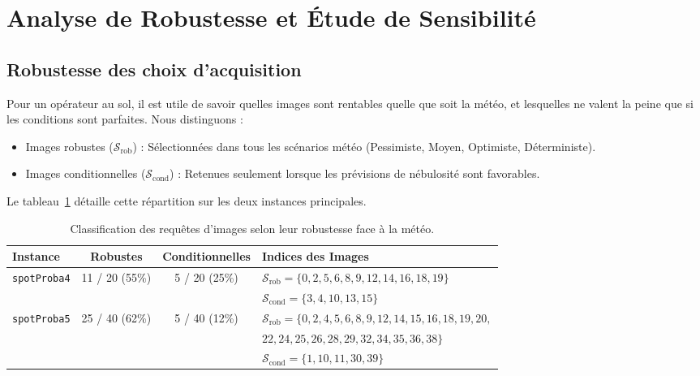 \section{Analyse de Robustesse et Étude de Sensibilité}
\label{sec:robustesse}

\subsection{Robustesse des choix d'acquisition}
Pour un opérateur au sol, il est utile de savoir quelles images sont rentables quelle que soit la météo, et lesquelles ne valent la peine que si les conditions sont parfaites. Nous distinguons :
\begin{itemize}
    \item Images robustes ($\mathcal{S}_{\text{rob}}$) : Sélectionnées dans tous les scénarios météo (Pessimiste, Moyen, Optimiste, Déterministe).
    \item Images conditionnelles ($\mathcal{S}_{\text{cond}}$) : Retenues seulement lorsque les prévisions de nébulosité sont favorables.
\end{itemize}

Le tableau~\ref{tab:robustesse} détaille cette répartition sur les deux instances principales.

\begin{table}[H]
\centering
\small
\begin{tabularx}{\textwidth}{lccl}
\toprule
\textbf{Instance} & \textbf{Robustes} & \textbf{Conditionnelles} & \textbf{Indices des Images} \\
\midrule
\multirow{2}{*}{\texttt{spotProba4}} & \multirow{2}{*}{11 / 20 (55\%)} & \multirow{2}{*}{5 / 20 (25\%)} & $\mathcal{S}_{\text{rob}} = \{0, 2, 5, 6, 8, 9, 12, 14, 16, 18, 19\}$ \\
 & & & $\mathcal{S}_{\text{cond}} = \{3, 4, 10, 13, 15\}$ \\
\midrule
\multirow{2}{*}{\texttt{spotProba5}} & \multirow{2}{*}{25 / 40 (62\%)} & \multirow{2}{*}{5 / 40 (12\%)} & $\mathcal{S}_{\text{rob}} = \{0, 2, 4, 5, 6, 8, 9, 12, 14, 15, 16, 18, 19, 20,$ \\
 & & & \quad\qquad $22, 24, 25, 26, 28, 29, 32, 34, 35, 36, 38\}$ \\
 & & & $\mathcal{S}_{\text{cond}} = \{1, 10, 11, 30, 39\}$ \\
\bottomrule
\end{tabularx}
\caption{Classification des requêtes d'images selon leur robustesse face à la météo.}
\label{tab:robustesse}
\end{table}

